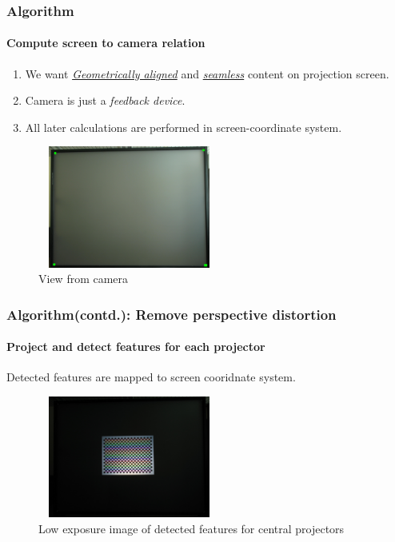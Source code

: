 \documentclass{beamer}
\begin{document}
\begin{frame}
\frametitle{Algorithm}
\framesubtitle{Compute screen to camera relation}
\begin{enumerate}
\item We want \hyperlink{concept}{\textit{Geometrically aligned}} and \hyperlink{concept}{\textit{seamless}} content on projection screen.
\item Camera is just a \textit{feedback device}.
\item All later calculations are performed in screen-coordinate system.
\end{enumerate}

\begin{figure}
\includegraphics[width=6cm, height = 4cm]{figures/debug_image_features.jpg}
\caption{View from camera}
\end{figure}
\end{frame}


\begin{frame}
\frametitle{Algorithm(contd.): Remove perspective distortion}
\framesubtitle{Project and detect features for each projector}
Detected features are mapped to screen cooridnate system.

\begin{figure}
\includegraphics[width=6cm, height=4cm]{figures/detected_corners.jpg}
\caption{Low exposure image of detected features for central projectors}
\end{figure}

\end{frame}
\end{document}
